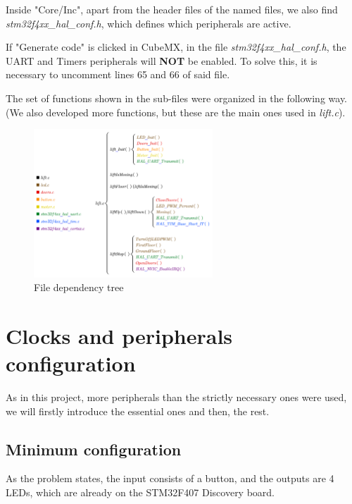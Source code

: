 Inside "Core/Inc", apart from the header files of the named files, we also find \textit{stm32f4xx\_hal\_conf.h}, which defines which peripherals are active.

\begin{cBox}
If "Generate code" is clicked in CubeMX, in the file \textit{stm32f4xx\_hal\_conf.h}, the UART and Timers peripherals will \textbf{NOT} be enabled. To solve this, it is necessary to uncomment lines 65 and 66 of said file.

\end{cBox}

\medskip

The set of functions shown in the sub-files were organized in the following way. (We also developed more functions, but these are the main ones used in \textit{lift.c}).

\begin{figure}[H]
    \centering
    \includegraphics[width=0.60\textwidth]{Graphics/AXGLYPH_PDF/TREE.pdf}
    \caption{File dependency tree} 
    \label{fig:File_management}
\end{figure}

\section{Clocks and peripherals configuration}

As in this project, more peripherals than the strictly necessary ones were used, we will firstly introduce the essential ones and then, the rest.

\subsection{Minimum configuration}

As the problem states, the input consists of a button, and the outputs are 4 LEDs, which are already on the STM32F407 Discovery board. \medskip


